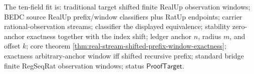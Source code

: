 The ten-field fit is: traditional target shifted finite RealUp observation
windows; BEDC source RealUp prefix/window classifiers plus RatUp endpoints;
carrier rational-observation streams; classifier the displayed equivalence;
stability zero-anchor exactness together with the index shift; ledger anchor
$n$, radius $m$, and offset $k$; core theorem
\autoref{thm:real-stream-shifted-prefix-window-exactness}; exactness
arbitrary-anchor window iff shifted recursive prefix; standard bridge finite
RegSeqRat observation windows; status $\mathsf{ProofTarget}$.
